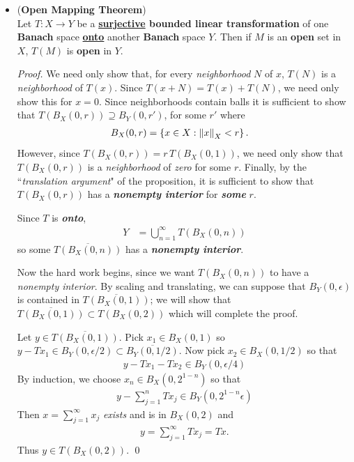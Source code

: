 \documentclass[11pt]{article}
\begin{document}
\begin{itemize}
\item 
\begin{theorem} (\textbf{Open Mapping Theorem}) \citep{reed1980methods} \\
Let $T: X \rightarrow Y$ be a \textbf{\underline{surjective} bounded linear transformation} of one \textbf{Banach} space \underline{\textbf{onto}} another \textbf{Banach} space $Y$.  Then if $M$ is an \textbf{open} set in $X$, $T(M)$ is \textbf{open} in $Y$. 
\end{theorem}
\begin{proof}
We need  only show that, for every \emph{neighborhood} $N$ of $x$, $T(N)$ is a \emph{neighborhood} of  $T(x)$. Since $T(x + N) = T(x) + T(N)$, we need only show this for $x = 0$.  Since neighborhoods contain balls it is sufficient to show that $T(B_{X}(0,r)) \supseteq B_{Y}(0, r')$, for 
some $r'$ where 
\begin{align*}
B_{X}(0, r) &= \left\{x \in X: \left\|x\right\|_{X} < r\right\}.
\end{align*}
However, since $T(B_{X}(0,r)) = r\,T(B_{X}(0,1))$, we need only show that $T(B_{X}(0,r))$ is a \emph{neighborhood} of \emph{zero} for some $r$. Finally, by the ``\emph{translation argument}" of the proposition, it is sufficient to show that $T(B_{X}(0,r))$ has a \emph{\textbf{nonempty interior}} for  \emph{\textbf{some}} $r$. 

Since $T$ is \emph{\textbf{onto}}, 
\begin{align*}
Y &= \bigcup_{n=1}^{\infty}T(B_{X}(0, n))
\end{align*}
so some $\overline{T(B_{X}(0, n))}$ has a \emph{\textbf{nonempty interior}}. 

Now the hard work begins, since we want $T(B_{X}(0, n))$ to have a \emph{nonempty interior}. By scaling and translating, we can 
suppose that $B_{Y}(0, \epsilon)$ is contained in $\overline{T(B_{X}(0, 1))}$; we will show that $\overline{T(B_{X}(0, 1))} \subset T(B_{X}(0, 2))$ 
which will complete the proof. 

Let $y\in \overline{T(B_{X}(0, 1))}$. Pick $x_1 \in B_{X}(0,1)$ so $y - Tx_1 \in B_{Y}(0, \epsilon/2) \subset \overline{B_Y(0, 1/2)}$. Now pick $x_2 \in B_{X}(0,1/2)$ 
so that 
\begin{align*}
y - Tx_1 -Tx_2 \in B_{Y}(0, \epsilon/4)
\end{align*}
By induction, we choose $x_n \in B_{X}(0, 2^{1-n})$ so that 
\begin{align*}
y - \sum_{j=1}^n T x_j \in B_{Y}(0, 2^{1-n}\epsilon)
\end{align*}
Then $x = \sum_{j=1}^{\infty}x_j$ \emph{exists} and is in $B_X(0, 2)$ and 
\begin{align*}
y = \sum_{j=1}^{\infty} T x_j = Tx.
\end{align*}
Thus $y \in T(B_{X}(0, 2))$. \qed
\end{proof}


\end{itemize}
\end{document}
